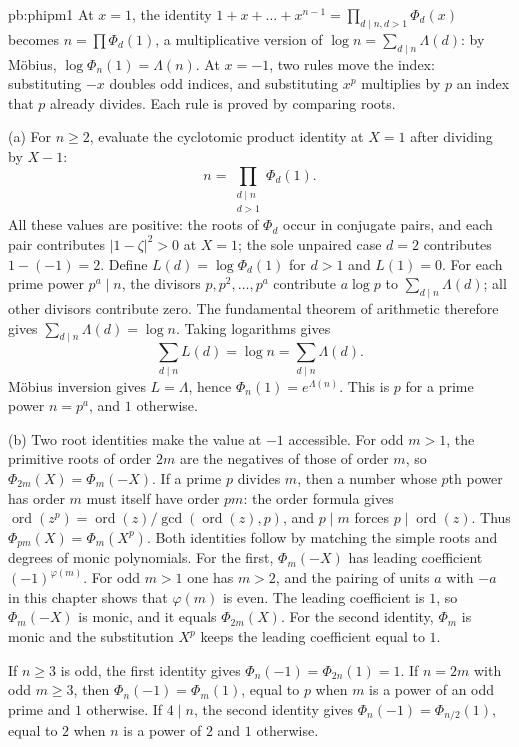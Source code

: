 \begin{solution}{pb:phipm1}
\idea At $x=1$, the identity $1+x+\dots+x^{n-1}=\prod_{d\mid n,d>1}\Phi_d(x)$ becomes $n=\prod\Phi_d(1)$, a
multiplicative version of $\log n=\sum_{d\mid n}\Lambda(d)$: by Möbius, $\log\Phi_n(1)=\Lambda(n)$. At $x=-1$, two rules
move the index: substituting $-x$ doubles odd indices, and substituting $x^p$ multiplies by $p$ an index that $p$
already divides. Each rule is proved by comparing roots.

\writeup (a) For $n\ge2$, evaluate the cyclotomic product identity at $X=1$ after dividing by $X-1$:
\[
n=\prod_{\substack{d\mid n\\d>1}}\Phi_d(1).
\]
All these values are positive: the roots of $\Phi_d$ occur in conjugate pairs, and each pair contributes $|1-\zeta|^2>0$ at $X=1$; the sole unpaired case $d=2$ contributes $1-(-1)=2$. Define $L(d)=\log\Phi_d(1)$ for $d>1$ and $L(1)=0$. For each prime power $p^a\mid n$, the divisors $p,p^2,\ldots,p^a$ contribute $a\log p$ to $\sum_{d\mid n}\Lambda(d)$; all other divisors contribute zero. The fundamental theorem of arithmetic therefore gives $\sum_{d\mid n}\Lambda(d)=\log n$. Taking logarithms gives
\[
\sum_{d\mid n}L(d)=\log n=\sum_{d\mid n}\Lambda(d).
\]
Möbius inversion gives $L=\Lambda$, hence $\Phi_n(1)=e^{\Lambda(n)}$. This is $p$ for a prime power $n=p^a$, and $1$ otherwise.

(b) Two root identities make the value at $-1$ accessible. For odd $m>1$, the primitive roots of order $2m$ are the negatives of those of order $m$, so $\Phi_{2m}(X)=\Phi_m(-X)$. If a prime $p$ divides $m$, then a number whose $p$th power has order $m$ must itself have order $pm$: the order formula gives $\operatorname{ord}(z^p)=\operatorname{ord}(z)/\gcd(\operatorname{ord}(z),p)$, and $p\mid m$ forces $p\mid\operatorname{ord}(z)$. Thus $\Phi_{pm}(X)=\Phi_m(X^p)$. Both identities follow by matching the simple roots and degrees of monic polynomials. For the first, $\Phi_m(-X)$ has leading coefficient $(-1)^{\varphi(m)}$. For odd $m>1$ one has $m>2$, and the pairing of units $a$ with $-a$ in this chapter shows that $\varphi(m)$ is even. The leading coefficient is $1$, so $\Phi_m(-X)$ is monic, and it equals $\Phi_{2m}(X)$. For the second identity, $\Phi_m$ is monic and the substitution $X^p$ keeps the leading coefficient equal to $1$.

If $n\ge3$ is odd, the first identity gives $\Phi_n(-1)=\Phi_{2n}(1)=1$. If $n=2m$ with odd $m\ge3$, then $\Phi_n(-1)=\Phi_m(1)$, equal to $p$ when $m$ is a power of an odd prime and $1$ otherwise. If $4\mid n$, the second identity gives $\Phi_n(-1)=\Phi_{n/2}(1)$, equal to $2$ when $n$ is a power of $2$ and $1$ otherwise.


\end{solution}
